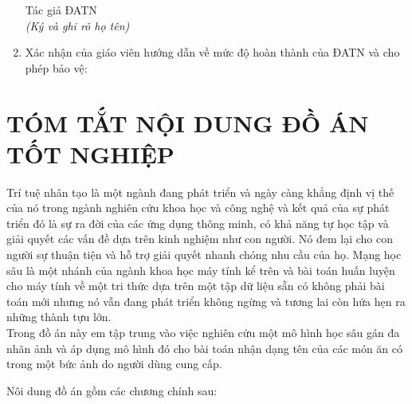 \documentclass[13pt, a4paper]{extreport}
\begin{document}
\begin{enumerate}
\begin{flushleft}
{{      \hspace{3.7in}Tác giả ĐATN \\
      \hspace{3.5in}\textit{(Ký và ghi rõ họ tên)}\\[1.5cm]}
    }
  \end{flushleft}
  \item Xác nhận của giáo viên hướng dẫn về mức độ hoàn thành của ĐATN và cho phép bảo vệ:
    \begin{flushleft}
	  {\fontsize{13pt}{15.6pt}
      }
  	\end{flushleft}
\end{enumerate}

\newpage
{}
\chapter*{TÓM TẮT NỘI DUNG ĐỒ ÁN TỐT NGHIỆP}
\fontsize{13}{15.6}\selectfont
\setlength{\parindent}{0.7cm}
Trí tuệ nhân tạo là một ngành đang phát triển và ngày càng khẳng định vị thế của nó trong ngành nghiên cứu khoa học và công nghệ và kết quả của sự phát triển đó là sự ra đời của các ứng dụng thông minh, có khả năng tự học tập và giải quyết các vấn đề dựa trên kinh nghiệm như con người. Nó đem lại cho con người sự thuận tiện và hỗ trợ giải quyết nhanh chóng nhu cầu của họ. Mạng học sâu là một nhánh của ngành khoa học máy tính kể trên và bài toán huấn luyện cho máy tính về một tri thức dựa trên một tập dữ liệu sẵn có không phải bài toán mới nhưng nó vẫn đang phát triển không ngừng và tương lai còn hứa hẹn ra những thành tựu lớn.\\
\indent Trong đồ án này em tập trung vào việc nghiên cứu một mô hình học sâu gán đa nhãn ảnh và áp dụng mô hình đó cho bài toán nhận dạng tên của các món ăn có trong một bức ảnh do người dùng cung cấp.

\vspace{2mm}
\indent Nôi dung đồ án gồm các chương chính sau:
\end{document}
